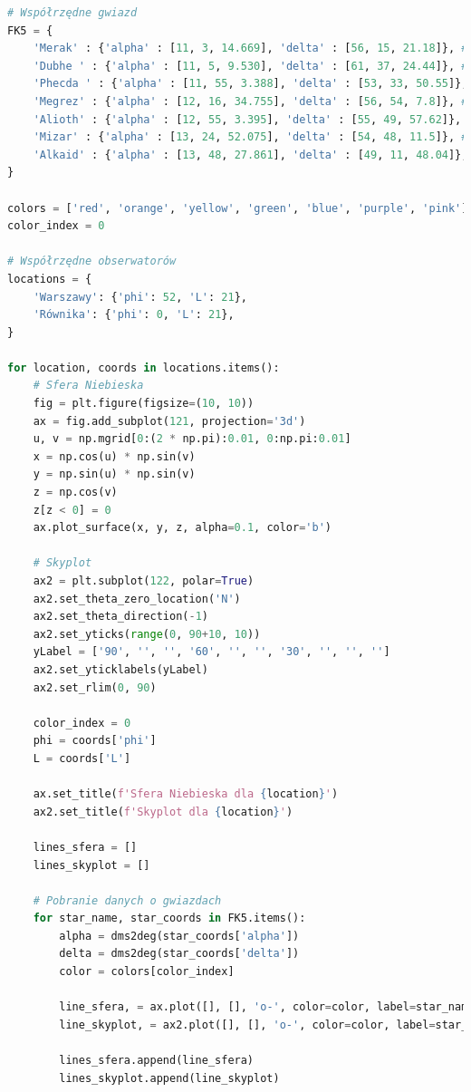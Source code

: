 \documentclass[fleqn,10pt,a4paper]{article}
\begin{document}
\begin{lstlisting}[language=Python, caption=Animacja położenia gwiazd Wielkiego Wozu, label = kod4]
# Współrzędne gwiazd
FK5 = {
    'Merak' : {'alpha' : [11, 3, 14.669], 'delta' : [56, 15, 21.18]}, #416
    'Dubhe ' : {'alpha' : [11, 5, 9.530], 'delta' : [61, 37, 24.44]}, #417
    'Phecda ' : {'alpha' : [11, 55, 3.388], 'delta' : [53, 33, 50.55]}, #447
    'Megrez' : {'alpha' : [12, 16, 34.755], 'delta' : [56, 54, 7.8]}, #456
    'Alioth' : {'alpha' : [12, 55, 3.395], 'delta' : [55, 49, 57.62]}, #483
    'Mizar' : {'alpha' : [13, 24, 52.075], 'delta' : [54, 48, 11.5]}, #497
    'Alkaid' : {'alpha' : [13, 48, 27.861], 'delta' : [49, 11, 48.04]}, #509
}

colors = ['red', 'orange', 'yellow', 'green', 'blue', 'purple', 'pink']
color_index = 0

# Współrzędne obserwatorów
locations = {
    'Warszawy': {'phi': 52, 'L': 21},
    'Równika': {'phi': 0, 'L': 21},
}

for location, coords in locations.items():
    # Sfera Niebieska
    fig = plt.figure(figsize=(10, 10))
    ax = fig.add_subplot(121, projection='3d')
    u, v = np.mgrid[0:(2 * np.pi):0.01, 0:np.pi:0.01]
    x = np.cos(u) * np.sin(v)
    y = np.sin(u) * np.sin(v)
    z = np.cos(v)
    z[z < 0] = 0
    ax.plot_surface(x, y, z, alpha=0.1, color='b')

    # Skyplot
    ax2 = plt.subplot(122, polar=True)
    ax2.set_theta_zero_location('N')
    ax2.set_theta_direction(-1)
    ax2.set_yticks(range(0, 90+10, 10))
    yLabel = ['90', '', '', '60', '', '', '30', '', '', '']
    ax2.set_yticklabels(yLabel)
    ax2.set_rlim(0, 90)

    color_index = 0
    phi = coords['phi']
    L = coords['L']

    ax.set_title(f'Sfera Niebieska dla {location}')
    ax2.set_title(f'Skyplot dla {location}')
    
    lines_sfera = []
    lines_skyplot = []
    
    # Pobranie danych o gwiazdach
    for star_name, star_coords in FK5.items():
        alpha = dms2deg(star_coords['alpha'])
        delta = dms2deg(star_coords['delta'])
        color = colors[color_index]
        
        line_sfera, = ax.plot([], [], 'o-', color=color, label=star_name)
        line_skyplot, = ax2.plot([], [], 'o-', color=color, label=star_name)
        
        lines_sfera.append(line_sfera)
        lines_skyplot.append(line_skyplot)
        

\end{lstlisting}
\end{document}
